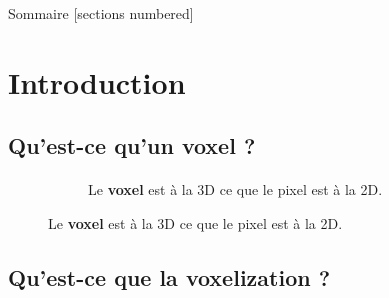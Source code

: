 \titleframe

\begin{frame}{Sommaire}
  [sections numbered]
  \tableofcontents[hideallsubsections]
\end{frame}


\section{Introduction}

\subsection{Qu'est-ce qu'un voxel ?}

\begin{frame}[fragile=singleslide]{\insertsectionhead}
  \framesubtitle{\insertsubsectionhead}
  \vspace{0.75cm}
  \begin{figure}[ht!]
    \begin{subfigure}{0.5\textwidth}
      \caption*{Le \textbf{voxel} est à la 3D ce que le pixel est à la 2D.}
    \end{subfigure}
  \end{figure}
\end{frame}

\subsection{Qu'est-ce que la voxelization ?}

